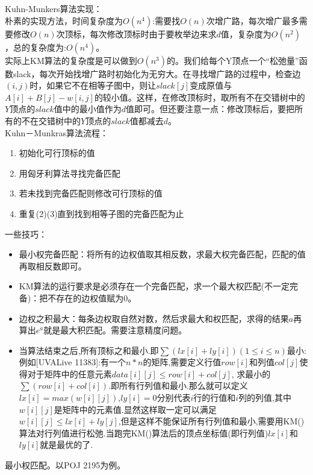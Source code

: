 Kuhn-Munkers算法实现： \\
朴素的实现方法，时间复杂度为$O(n^4)$:需要找$O(n)$次增广路，每次增广最多需要修改$O(n)$次顶标，每次修改顶标时由于要枚举边来求$d$值，复杂度为$O(n^2)$，总的复杂度为:$O(n^4)$。 \\
实际上KM算法的复杂度是可以做到$O(n^3)$的。我们给每个Y顶点一个“松弛量”函数slack，每次开始找增广路时初始化为无穷大。在寻找增广路的过程中，检查边$(i,j)$时，如果它不在相等子图中，则让$slack[j]$变成原值与$A[i]+B[j]-w[i,j]$的较小值。这样，在修改顶标时，取所有不在交错树中的$Y$顶点的$slack$值中的最小值作为$d$值即可。但还要注意一点：修改顶标后，要把所有的不在交错树中的$Y$顶点的$slack$值都减去$d$。 \\

Kuhn－Munkras算法流程：
\begin{enumerate}
\item 初始化可行顶标的值
\item 用匈牙利算法寻找完备匹配
\item 若未找到完备匹配则修改可行顶标的值
\item 重复(2)(3)直到找到相等子图的完备匹配为止
\end{enumerate}

一些技巧：\\
\begin{itemize}
\item 最小权完备匹配：将所有的边权值取其相反数，求最大权完备匹配，匹配的值再取相反数即可。
\item KM算法的运行要求是必须存在一个完备匹配，求一个最大权匹配(不一定完备)：把不存在的边权值赋为0。
\item 边权之积最大：每条边权取自然对数，然后求最大和权匹配，求得的结果$a$再算出$e^a$就是最大积匹配。需要注意精度问题。
\item 当算法结束之后,所有顶标之和最小.即$\sum{(lx[i] + ly[i])}(1\leq i\leq n)$最小: \\
 例如[UVALive 11383]:有一个$n*n$的矩阵,需要定义行值$row[i]$和列值$col[j]$使得对于矩阵中的任意元素$data[i][j] \leq row[i] + col[j]$, 求最小的$\sum{(row[i] +  col[i])}$.即所有行列值和最小.那么就可以定义$lx[i] = max(w[i][j])$,$ly[i] = 0$分别代表$i$行的行值和$i$列的列值,其中$w[i][j]$是矩阵中的元素值.显然这样取一定可以满足$w[i][j] \leq lx[i] + ly[j]$,但是这样不能保证所有行列值和最小,需要用KM()算法对行列值进行松弛.当跑完KM()算法后的顶点坐标值(即行列值)$lx[i]$和$ly[i]$就是最优的了.
\end{itemize}


最小权匹配。以POJ 2195为例。 \\

